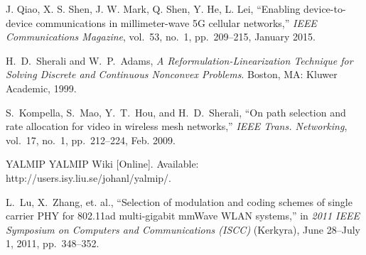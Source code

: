 \documentclass[journal]{IEEEtran}
\begin{document}
\begin{thebibliography}{10}

J. Qiao, X. S. Shen, J. W. Mark, Q. Shen, Y. He, L. Lei, ``Enabling device-to-device communications in millimeter-wave 5G cellular networks,'' \emph{IEEE Communications Magazine}, vol.~53, no.~1, pp.~209--215, January 2015.

 H.~D.~Sherali and W.~P.~Adams, \emph{A Reformulation-Linearization Technique for Solving Discrete
and Continuous Nonconvex Problems}. Boston, MA: Kluwer Academic, 1999.


 S.~Kompella, S.~Mao, Y.~T.~Hou, and H.~D.~Sherali, ``On path selection and rate allocation for
video in wireless mesh networks,'' \emph{IEEE Trans. Networking}, vol.~17, no.~1, pp.~212--224,
Feb. 2009.









 YALMIP YALMIP Wiki [Online]. Available: http://users.isy.liu.se/johanl/yalmip/.


L.~Lu, X.~Zhang, et. al., ``Selection of modulation and coding schemes of single carrier PHY for
802.11ad multi-gigabit mmWave WLAN systems,'' in \emph{2011 IEEE Symposium on Computers and
Communications (ISCC)} (Kerkyra), June 28--July 1, 2011, pp.~348--352.













\end{thebibliography}
\end{document}
